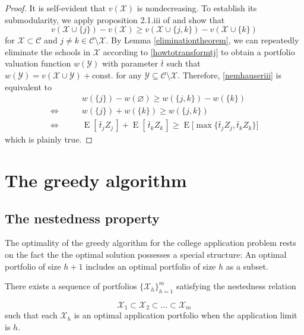 \begin{proof}
It is self-evident that $v(\mathcal{X})$ is nondecreasing. To establish its submodularity, we apply proposition 2.1.iii of \cite{nemhauserandwolsey1978} and show that
\begin{equation}\label{nemhauseriii}
v(\mathcal{X} \cup \{j\}) - v(\mathcal{X}) \geq 
v(\mathcal{X} \cup \{j, k\}) - v(\mathcal{X} \cup \{k\})
\end{equation}
for $\mathcal{X} \subset \mathcal{C}$ and $j \neq k \in \mathcal{C} \setminus \mathcal{X}$. By Lemma \ref{eliminationtheorem}, we can repeatedly eliminate the schools in $\mathcal{X}$ according to \eqref{howtotransformtj} to obtain a portfolio valuation function $w(\mathcal{Y})$ with parameter $\bar t$ such that $w(\mathcal{Y}) = v(\mathcal{X} \cup \mathcal{Y}) + \text{const.}$ for any $\mathcal{Y} \subseteq \mathcal{C} \setminus \mathcal{X}$. Therefore, \eqref{nemhauseriii} is equivalent to
\begin{align}
& w(\{j\}) - w(\varnothing) \geq w(\{j, k\}) - w(\{k\}) \\
\iff \qquad &w(\{j\})  +  w(\{k\})  \geq w(\{j, k\})  \\
\iff \qquad &\operatorname{E}[\,\bar t_j Z_j\,] + \operatorname{E}[\,\bar t_k Z_k\,] 
\geq \operatorname{E}\bigl[\max\{ \bar t_j Z_j, \bar t_k Z_k \} \bigr]
\end{align}
which is plainly true. 
\end{proof}











\section{The greedy algorithm} \label{sectionGreedy}


\subsection{The nestedness property} 
The optimality of the greedy algorithm for the college application problem rests on the fact the the optimal solution possesses a special structure: An optimal portfolio of size $h+1$ includes an optimal portfolio of size $h$ as a subset.

\begin{theorem} \label{nestedapplication}
There exists a sequence of portfolios $\{\mathcal{X}_h\}_{h=1}^m$ satisfying the nestedness relation

\begin{equation}
\mathcal{X}_1 \subset \mathcal{X}_2\subset \dots \subset \mathcal{X}_m
\end{equation}
such that each $\mathcal{X}_h$ is an optimal application portfolio when the application limit is $h$.
\end{theorem}

